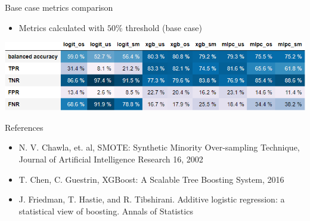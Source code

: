 \documentclass{beamer}
\begin{document}
\begin{frame}{Base case metrics comparison}

\begin{itemize}
\item Metrics calculated with $50$\% threshold (base case)
\end{itemize}

\begin{center}
\includegraphics[scale=0.6]{img/balance_acc_table.png}
\end{center}
\end{frame}

\begin{frame}{References}

\begin{itemize}
\item N. V. Chawla, et. al, SMOTE: Synthetic Minority Over-sampling Technique, Journal of Artificial Intelligence Research 16, 2002
\item T. Chen, C. Guestrin, XGBoost: A Scalable Tree Boosting System, 2016
\item J. Friedman, T. Hastie, and R. Tibshirani. Additive logistic
regression: a statistical view of boosting. Annals of
Statistics
\end{itemize}
\end{frame}
\end{document}
